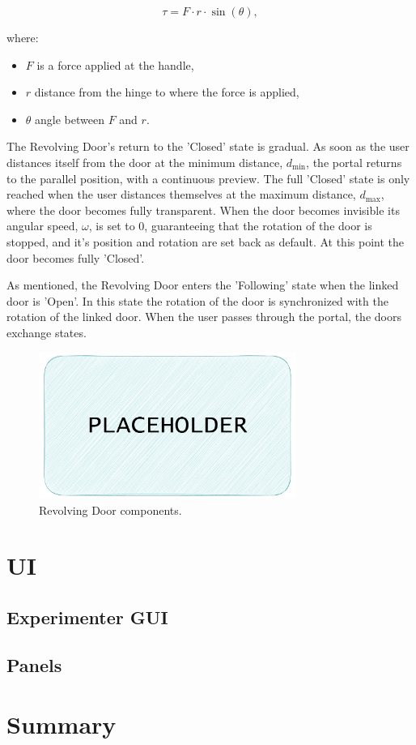 \[
\tau = F \cdot r \cdot \sin(\theta),
\]

where:
\begin{itemize}
  \item \(F\) is a force applied at the handle,
  \item \(r\) distance from the hinge to where the force is applied,
  \item $\theta$ angle between \(F\) and \(r\).
\end{itemize}

The Revolving Door's return to the 'Closed' state is gradual. As soon as the user distances itself from the door at the minimum distance, $d_{\min}$,
the portal returns to the parallel position, with a continuous preview. The full 'Closed' state is only reached when the user distances themselves 
at the maximum distance, $d_{\max}$, where the door becomes fully transparent. When the door becomes invisible its angular speed, $\omega$,
is set to 0, guaranteeing that the rotation of the door is stopped, and it's position and rotation are set back as default. At this point the door 
becomes fully 'Closed'.

As mentioned, the Revolving Door enters the 'Following' state when the linked door is 'Open'. In this state the rotation of the door is synchronized
with the rotation of the linked door. When the user passes through the portal, the doors exchange states.

\begin{figure}[t]
    \centering
     \includegraphics[width=0.75\textwidth]{NOVAthesisFiles/Images/placeholder.pdf}
     \caption[Revolving Door components.]
     {Revolving Door components.}
     \label{fig:mov-portal-comp}
\end{figure}

\section{UI}
\label{sec:ui}

\subsection{Experimenter GUI}
\label{sec:gui}



\subsection{Panels}
\label{sec:panels}

\section{Summary}
\label{sec:summary}
 


